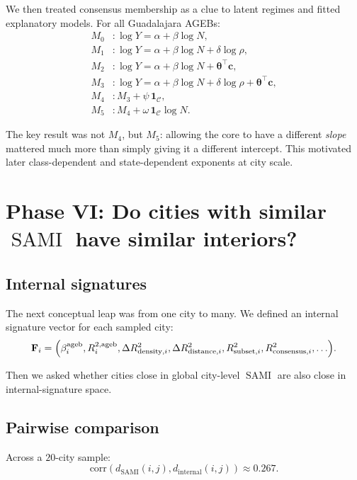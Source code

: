 \documentclass[11pt]{article}
\newcommand{\SAMI}{\operatorname{SAMI}}
\begin{document}
We then treated consensus membership as a clue to latent regimes and fitted explanatory models. For all Guadalajara AGEBs:
\begin{align}
M_0 &: \log Y = \alpha + \beta \log N,\\
M_1 &: \log Y = \alpha + \beta \log N + \delta \log \rho,\\
M_2 &: \log Y = \alpha + \beta \log N + \bm{\theta}^\top \mathbf{c},\\
M_3 &: \log Y = \alpha + \beta \log N + \delta \log \rho + \bm{\theta}^\top \mathbf{c},\\
M_4 &: M_3 + \psi\, \mathbf{1}_{\mathcal{C}},\\
M_5 &: M_4 + \omega\, \mathbf{1}_{\mathcal{C}}\log N.
\end{align}

The key result was not \(M_4\), but \(M_5\): allowing the core to have a different \emph{slope} mattered much more than simply giving it a different intercept. This motivated later class-dependent and state-dependent exponents at city scale.

\section{Phase VI: Do cities with similar \(\SAMI\) have similar interiors?}

\subsection{Internal signatures}

The next conceptual leap was from one city to many. We defined an internal signature vector for each sampled city:
\begin{equation}
\mathbf{F}_i
=
\Bigl(
\beta^{\mathrm{ageb}}_i,
R^{2,\mathrm{ageb}}_i,
\Delta R^2_{\mathrm{density},i},
\Delta R^2_{\mathrm{distance},i},
R^2_{\mathrm{subset},i},
R^2_{\mathrm{consensus},i},
\ldots
\Bigr).
\end{equation}

Then we asked whether cities close in global city-level \(\SAMI\) are also close in internal-signature space.

\subsection{Pairwise comparison}

Across a \(20\)-city sample:
\begin{equation}
\mathrm{corr}\!\left(
d_{\SAMI}(i,j), d_{\mathrm{internal}}(i,j)
\right)
\approx 0.267.
\end{equation}
\end{document}
